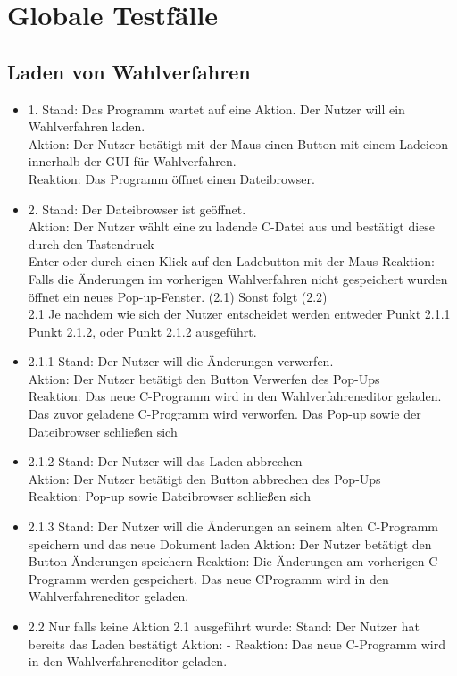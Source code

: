 \documentclass[a4paper]{scrreprt}
\begin{document}
\chapter{Globale Testfälle}
\section{Laden von Wahlverfahren}
\begin{itemize}

\item 1. Stand: Das Programm wartet auf eine Aktion. Der Nutzer will ein Wahlverfahren laden.\\
Aktion: Der Nutzer betätigt mit der Maus einen Button mit einem Ladeicon innerhalb der GUI für Wahlverfahren.\\
Reaktion: Das Programm öffnet einen Dateibrowser.\\

\item 2. Stand: Der Dateibrowser ist geöffnet.\\
Aktion: Der Nutzer wählt eine zu ladende C-Datei aus und bestätigt diese durch den Tastendruck\\
Enter oder durch einen Klick auf den Ladebutton mit der Maus
Reaktion: Falls die Änderungen im vorherigen Wahlverfahren nicht gespeichert wurden öffnet ein neues Pop-up-Fenster. (2.1) Sonst folgt (2.2)\\

2.1 Je nachdem wie sich der Nutzer entscheidet werden entweder Punkt 2.1.1 Punkt 2.1.2, oder Punkt 2.1.2 ausgeführt.

\item 2.1.1 Stand: Der Nutzer will die Änderungen verwerfen.\\
Aktion: Der Nutzer betätigt den Button Verwerfen des Pop-Ups\\
Reaktion: Das neue C-Programm wird in den Wahlverfahreneditor geladen. Das zuvor
geladene C-Programm wird verworfen. Das Pop-up sowie der Dateibrowser
schließen sich\\

\item 2.1.2 Stand: Der Nutzer will das Laden abbrechen\\
Aktion: Der Nutzer betätigt den Button abbrechen des Pop-Ups\\
Reaktion: Pop-up sowie Dateibrowser schließen sich\\

\item 2.1.3 Stand: Der Nutzer will die Änderungen an seinem alten C-Programm speichern und das
neue Dokument laden
Aktion: Der Nutzer betätigt den Button Änderungen speichern
Reaktion: Die Änderungen am vorherigen C-Programm werden gespeichert. Das neue CProgramm
wird in den Wahlverfahreneditor geladen.

\item 2.2
Nur falls keine Aktion 2.1 ausgeführt wurde:
Stand: Der Nutzer hat bereits das Laden bestätigt
Aktion: -
Reaktion: Das neue C-Programm wird in den Wahlverfahreneditor geladen.

\end{itemize}
\end{document}
